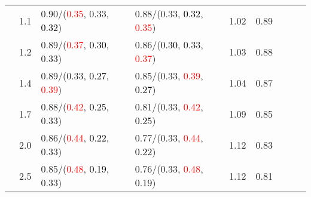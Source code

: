 \documentclass[10pt,a4paper]{report}
\begin{document}
\begin{table}[!htbp]
\begin{center}
{\begin{tabular}{ccllccccc}
				  & 1.1                               & 0.90/(\textcolor{red}{0.35}, 0.33, \textcolor{black}{0.32})                                                                                                                                   & 0.88/(0.33, \textcolor{black}{0.32}, \textcolor{red}{0.35})                                                                                                                                   & 1.02             & 0.89                     \\
				  & 1.2                               & 0.89/(\textcolor{red}{0.37}, \textcolor{black}{0.30}, 0.33)                                                                                                                                   & 0.86/(\textcolor{black}{0.30}, 0.33, \textcolor{red}{0.37})                                                                                                                                   & 1.03             & 0.88                     \\
				  & 1.4                               & 0.89/(0.33, \textcolor{black}{0.27}, \textcolor{red}{0.39})                                                                                                                                   & 0.85/(0.33, \textcolor{red}{0.39}, \textcolor{black}{0.27})                                                                                                                                   & 1.04             & 0.87                     \\
				  & 1.7                               & 0.88/(\textcolor{red}{0.42}, \textcolor{black}{0.25}, 0.33)                                                                                                                                   & 0.81/(0.33, \textcolor{red}{0.42}, \textcolor{black}{0.25})                                                                                                                                   & 1.09             & 0.85                     \\
				  & 2.0                               & 0.86/(\textcolor{red}{0.44}, \textcolor{black}{0.22}, 0.33)                                                                                                                                   & 0.77/(0.33, \textcolor{red}{0.44}, \textcolor{black}{0.22})                                                                                                                                   & 1.12             & 0.83                     \\
				  & 2.5                               & 0.85/(\textcolor{red}{0.48}, \textcolor{black}{0.19}, 0.33)                                                                                                                                   & 0.76/(0.33, \textcolor{red}{0.48}, \textcolor{black}{0.19})                                                                                                                                   & 1.12             & 0.81                     \\

\end{tabular}}
\end{center}
\end{table}
\end{document}
